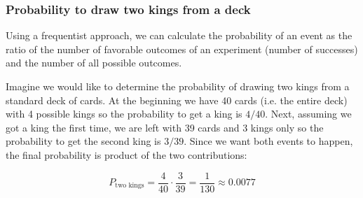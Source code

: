 \subsubsection{Probability to draw two kings from a deck}
Using a frequentist approach, we can calculate the
probability of an event as the ratio of the number of favorable outcomes
of an experiment (number of successes) and the number of all possible
outcomes. 

Imagine we would like to determine the probability of drawing two kings from a standard deck of cards.
At the beginning we have 40 cards (i.e. the entire deck) with 4 possible kings so the probability to get a king is $4/40$. Next, assuming we got a king the first time, we are left with 39 cards and 3 kings only so the probability to get the second king is $3/39$. Since we want both events to happen, the final probability is product of the two contributions:

\[P_\textrm{two kings} = \frac{4}{40} \cdot \frac{3}{39} = \frac{1}{130} \approx 0.0077\]

